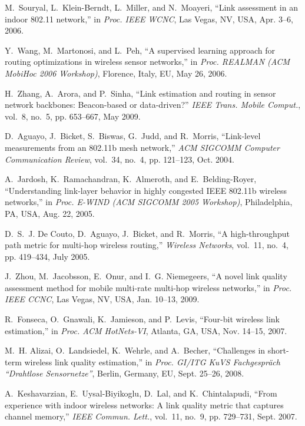 \documentclass[11pt,draftclsnofoot,journal,onecolumn]{IEEEtran}
\begin{document}
\begin{thebibliography}{10}
M.~{Souryal}, L.~{Klein-Berndt}, L.~{Miller}, and N.~{Moayeri}, ``Link
  assessment in an indoor 802.11 network,'' in \emph{Proc. IEEE WCNC}, Las
  Vegas, NV, USA, Apr. 3--6, 2006.

Y.~{Wang}, M.~{Martonosi}, and L.~{Peh}, ``A supervised learning approach for
  routing optimizations in wireless sensor networks,'' in \emph{Proc. REALMAN
  (ACM MobiHoc 2006 Workshop)}, Florence, Italy, EU, May 26, 2006.

H.~{Zhang}, A.~{Arora}, and P.~{Sinha}, ``Link estimation and routing in sensor
  network backbones: Beacon-based or data-driven?'' \emph{{IEEE} Trans. Mobile
  Comput.}, vol.~8, no.~5, pp. 653--667, May 2009.

D.~{Aguayo}, J.~{Bicket}, S.~{Biswas}, G.~{Judd}, and R.~{Morris}, ``Link-level
  measurements from an 802.11b mesh network,'' \emph{ACM SIGCOMM Computer
  Communication Review}, vol.~34, no.~4, pp. 121--123, Oct. 2004.

A.~{Jardosh}, K.~{Ramachandran}, K.~{Almeroth}, and E.~Belding-Royer,
  ``Understanding link-layer behavior in highly congested {IEEE} 802.11b
  wireless networks,'' in \emph{Proc. E-WIND (ACM SIGCOMM 2005 Workshop)},
  Philadelphia, PA, USA, Aug. 22, 2005.

D.~S.~J. {De Couto}, D.~{Aguayo}, J.~{Bicket}, and R.~{Morris}, ``A
  high-throughput path metric for multi-hop wireless routing,'' \emph{Wireless
  Networks}, vol.~11, no.~4, pp. 419--434, July 2005.

J.~{Zhou}, M.~{Jacobsson}, E.~{Onur}, and I.~G. {Niemegeers}, ``A novel link
  quality assessment method for mobile multi-rate multi-hop wireless
  networks,'' in \emph{Proc. IEEE CCNC}, Las Vegas, NV, USA, Jan. 10--13, 2009.

R.~{Fonseca}, O.~{Gnawali}, K.~{Jamieson}, and P.~{Levis}, ``Four-bit wireless
  link estimation,'' in \emph{Proc. ACM HotNets-VI}, Atlanta, GA, USA, Nov.
  14--15, 2007.

M.~H. {Alizai}, O.~{Landsiedel}, K.~{Wehrle}, and A.~{Becher}, ``Challenges in
  short-term wireless link quality estimation,'' in \emph{Proc. GI/ITG KuVS
  Fachgespr\"{a}ch ``Drahtlose Sensornetze''}, Berlin, Germany, EU, Sept.
  25--26, 2008.

A.~{Keshavarzian}, E.~{Uysal-Biyikoglu}, D.~{Lal}, and K.~{Chintalapudi},
  ``From experience with indoor wireless networks: A link quality metric that
  captures channel memory,'' \emph{{IEEE} Commun. Lett.}, vol.~11, no.~9, pp.
  729--731, Sept. 2007.


\end{thebibliography}
\end{document}
